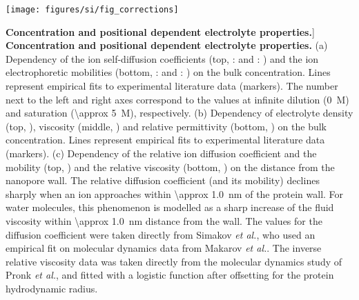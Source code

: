 
\begin{figure*}[b]

\centering

\texttt{[image: figures/si/fig\_corrections]}

\caption
[\textbf{Concentration and positional dependent electrolyte properties.}]
{
\textbf{Concentration and positional dependent electrolyte properties.}
(a)
Dependency of the ion self-diffusion coefficients (top, :  and : 
) and the ion electrophoretic mobilities (bottom, : 
 and : ) on the bulk  
concentration. Lines represent empirical fits to experimental literature data (markers). The number next to 
the left and right axes correspond to the values at infinite dilution (\SI{0}{M}) and saturation (\SI{\approx 
5}{M}), respectively.
(b)
Dependency of electrolyte density (top, ), viscosity (middle, 
) and relative permittivity (bottom, ) on the 
bulk  concentration. Lines represent empirical fits to experimental literature data (markers).
(c)
Dependency of the relative ion diffusion coefficient and the mobility (top, ) 
and the relative viscosity (bottom, ) on the distance from the nanopore wall. 
The relative diffusion coefficient (and its mobility) declines sharply when an ion approaches within 
\SI{\approx 1.0}{\nm} of the protein wall. For water molecules, this phenomenon is modelled as a sharp 
increase of the fluid viscosity within \SI{\approx 1.0}{\nm} distance from the wall.
The values for the diffusion coefficient were taken directly from Simakov \textit{et al.}\cite{simakov2010}, who used an empirical fit on molecular dynamics data from Makarov \textit{et al.}\cite{makarov1998}. The inverse relative viscosity data was taken directly from the molecular dynamics study of Pronk \textit{et al.}\cite{pronk2013}, and fitted with a logistic function after offsetting for the protein hydrodynamic radius.
}

\label{fig:corrections}

\end{figure*}

